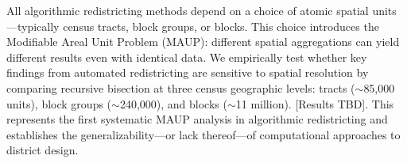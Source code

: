 
All algorithmic redistricting methods depend on a choice of atomic spatial units---typically census tracts, block groups, or blocks. This choice introduces the Modifiable Areal Unit Problem (MAUP): different spatial aggregations can yield different results even with identical data. We empirically test whether key findings from automated redistricting are sensitive to spatial resolution by comparing recursive bisection at three census geographic levels: tracts ($\sim$85,000 units), block groups ($\sim$240,000), and blocks ($\sim$11 million). [Results TBD]. This represents the first systematic MAUP analysis in algorithmic redistricting and establishes the generalizability---or lack thereof---of computational approaches to district design.
